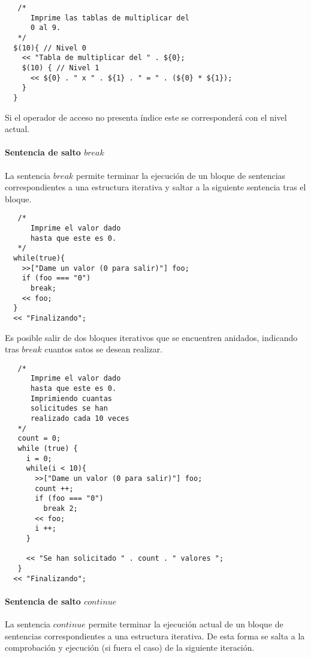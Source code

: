 \begin{lstlisting}
   /*
      Imprime las tablas de multiplicar del 
      0 al 9.
   */
  $(10){ // Nivel 0
    << "Tabla de multiplicar del " . ${0};
    $(10) { // Nivel 1
      << ${0} . " x " . ${1} . " = " . (${0} * ${1}); 
    }
  }
\end{lstlisting}

Si el operador de acceso no presenta índice este se corresponderá con el nivel actual.



\paragraph{Sentencia de salto $break$} \label{sec:stmt_break}
La sentencia $break$ permite terminar la ejecución de un bloque de sentencias correspondientes a una estructura iterativa y saltar a la siguiente sentencia tras el bloque. \\

\begin{lstlisting}
   /*
      Imprime el valor dado
      hasta que este es 0.
   */
  while(true){
    >>["Dame un valor (0 para salir)"] foo;
    if (foo === "0")
      break;
    << foo;
  }
  << "Finalizando";
\end{lstlisting}

Es posible salir de dos bloques iterativos que se encuentren anidados, indicando tras $break$ cuantos satos se desean realizar. \\

\begin{lstlisting}
   /*
      Imprime el valor dado
      hasta que este es 0.
      Imprimiendo cuantas 
      solicitudes se han 
      realizado cada 10 veces
   */
   count = 0;
   while (true) {
     i = 0;
     while(i < 10){
       >>["Dame un valor (0 para salir)"] foo;
       count ++;
       if (foo === "0")
         break 2;
       << foo;
       i ++;
     }
     
     << "Se han solicitado " . count . " valores ";
   }
  << "Finalizando";
\end{lstlisting} 

\paragraph{Sentencia de salto $continue$} \label{sec:stmt_continue}

La sentencia $continue$ permite terminar la ejecución actual de un bloque de sentencias correspondientes a una estructura iterativa. De esta forma se salta a la comprobación y 
ejecución (si fuera el caso) de la siguiente iteración. \\

